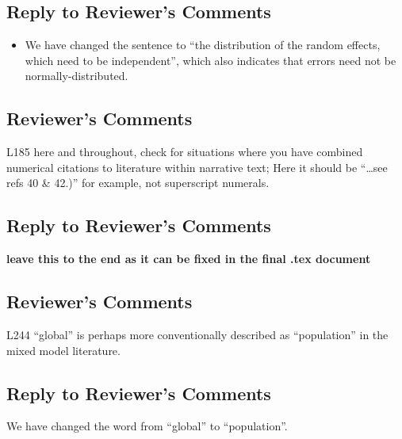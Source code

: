 \documentclass[
]{article}
\providecommand{\tightlist}{%
  \setlength{\itemsep}{0pt}\setlength{\parskip}{0pt}}
\begin{document}
\hypertarget{section-18}{%
\subsection{\texorpdfstring{\textcolor{reviewersblue} {Reply to Reviewer's Comments}}{}}\label{section-18}}

\begin{itemize}
\tightlist
\item
  We have changed the sentence to ``the distribution of the random effects, which need to be independent'', which also indicates that errors need not be normally-distributed.
\end{itemize}

\hypertarget{reviewers-comments-18}{%
\subsection{Reviewer's Comments}\label{reviewers-comments-18}}

L185 here and throughout, check for situations where you have combined numerical citations to literature within narrative text; Here it should be ``\ldots see refs 40 \& 42.)'' for example, not superscript numerals.

\hypertarget{section-19}{%
\subsection{\texorpdfstring{\textcolor{reviewersblue} {Reply to Reviewer's Comments}}{}}\label{section-19}}

\textbf{leave this to the end as it can be fixed in the final .tex document}

\hypertarget{reviewers-comments-19}{%
\subsection{Reviewer's Comments}\label{reviewers-comments-19}}

L244 ``global'' is perhaps more conventionally described as ``population'' in the mixed model literature.

\hypertarget{section-20}{%
\subsection{\texorpdfstring{\textcolor{reviewersblue} {Reply to Reviewer's Comments}}{}}\label{section-20}}

We have changed the word from ``global'' to ``population''.
\end{document}

